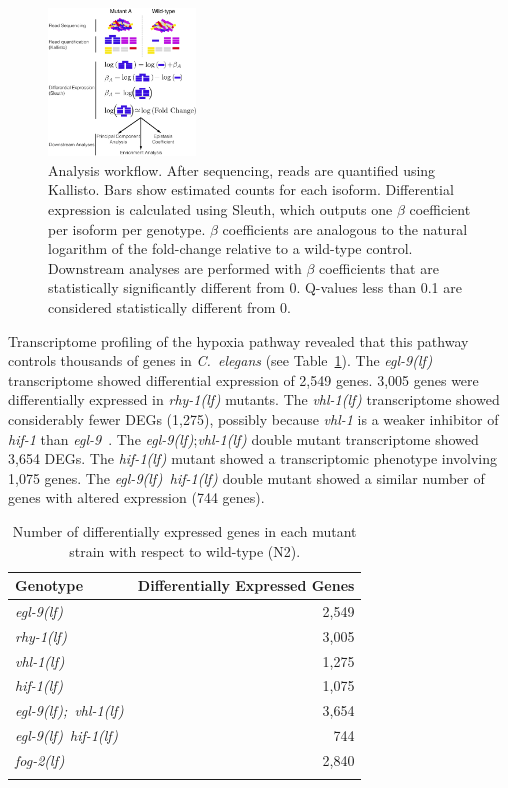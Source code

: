 \documentclass[9pt,twocolumn,twoside]{pnas-new}
\newcommand{\cel}{\emph{C.~elegans}}
\newcommand{\gene}[1]{\mbox{\emph{#1}}}
\newcommand{\fog}{\gene{fog-2(lf)}}
\newcommand{\egl}{\gene{egl-9(lf)}}
\newcommand{\rhy}{\gene{rhy-1(lf)}}
\newcommand{\vhl}{\gene{vhl-1(lf)}}
\newcommand{\eglvhl}{\gene{egl-9(lf); vhl-1(lf)}}
\newcommand{\eglhif}{\gene{egl-9(lf) hif-1(lf)}}
\newcommand{\hif}{\gene{hif-1(lf)}}
\newcommand{\egln}{2,549}
\newcommand{\rhyn}{3,005}
\newcommand{\vhln}{1,275}
\newcommand{\eglvhln}{3,654}
\newcommand{\hifn}{1,075}
\newcommand{\eglhifn}{744}
\newcommand{\fogn}{2,840}
\begin{document}
\begin{figure}[tbhp]
  \centering
  \includegraphics[width=0.35\textwidth]{../figs/meaningofbeta.pdf}
  \caption{
    Analysis workflow. After sequencing, reads are quantified using Kallisto.
    Bars show estimated counts for each isoform. Differential expression is
    calculated using Sleuth, which outputs one $\beta$ coefficient per isoform
    per genotype. $\beta$ coefficients are analogous to the natural logarithm of
    the fold-change relative to a wild-type control. Downstream analyses are
    performed with $\beta$ coefficients that are statistically significantly
    different from 0. Q-values less than 0.1 are considered statistically
    different from 0.
  }
\label{fig:explain}
\end{figure}

Transcriptome profiling of the hypoxia pathway revealed that this pathway
controls thousands of genes in \cel{} (see Table~\ref{tab:genes}). The \egl{}
transcriptome showed differential expression of \egln{} genes. \rhyn{} genes
were differentially expressed in \rhy{} mutants. The \vhl{} transcriptome showed
considerably fewer DEGs (\vhln{}), possibly because \gene{vhl-1} is a weaker
inhibitor of \gene{hif-1} than \gene{egl-9}~\cite{Shao2009}. The \egl{};\vhl{}
double mutant transcriptome showed \eglvhln{} DEGs. The \hif{} mutant showed a
transcriptomic phenotype involving \hifn{} genes. The \eglhif{} double mutant
showed a similar number of genes with altered expression (\eglhifn{} genes).


\begin{table}[tbhp]
  \centering
  \begin{tabular}{lr}
    \toprule{}
    Genotype & Differentially Expressed Genes\\
    \midrule{}\egl{} & \egln{}\\
    \rhy{} & \rhyn{}\\
    \vhl{} & \vhln{}\\
    \hif{} & \hifn{}\\
    \eglvhl{} & \eglvhln{}\\
    \eglhif{} & \eglhifn{}\\
    \fog{} & \fogn{}\\
    \bottomrule{}
  \end{tabular}
  \caption{Number of differentially expressed genes in each mutant strain with
  respect to wild-type (N2).}
\label{tab:genes}
\end{table}
\end{document}
